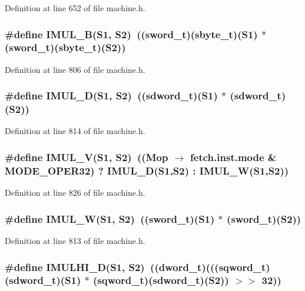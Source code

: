 Definition at line 652 of file machine.h.
\subsubsection[{IMUL\_\-B}]{\setlength{\rightskip}{0pt plus 5cm}\#define IMUL\_\-B(S1, \/  S2)~(({\bf sword\_\-t})({\bf sbyte\_\-t})(S1) $\ast$ ({\bf sword\_\-t})({\bf sbyte\_\-t})(S2))}\label{machine_8h_cafafb68534b37851dfa11e6515ffd0f}




Definition at line 806 of file machine.h.
\subsubsection[{IMUL\_\-D}]{\setlength{\rightskip}{0pt plus 5cm}\#define IMUL\_\-D(S1, \/  S2)~(({\bf sdword\_\-t})(S1) $\ast$ ({\bf sdword\_\-t})(S2))}\label{machine_8h_0c66111ef2b043f4fe01d81da678c6b4}




Definition at line 814 of file machine.h.
\subsubsection[{IMUL\_\-V}]{\setlength{\rightskip}{0pt plus 5cm}\#define IMUL\_\-V(S1, \/  S2)~((Mop $\rightarrow$ fetch.inst.mode \& MODE\_\-OPER32) ? IMUL\_\-D(S1,S2) : IMUL\_\-W(S1,S2))}\label{machine_8h_2ff4235e7ab1b8c32112965e6a3f339c}




Definition at line 826 of file machine.h.
\subsubsection[{IMUL\_\-W}]{\setlength{\rightskip}{0pt plus 5cm}\#define IMUL\_\-W(S1, \/  S2)~(({\bf sword\_\-t})(S1) $\ast$ ({\bf sword\_\-t})(S2))}\label{machine_8h_a920fdd017c530844661ca214ff48dd9}




Definition at line 813 of file machine.h.
\subsubsection[{IMULHI\_\-D}]{\setlength{\rightskip}{0pt plus 5cm}\#define IMULHI\_\-D(S1, \/  S2)~(({\bf dword\_\-t})(((sqword\_\-t)({\bf sdword\_\-t})(S1) $\ast$ (sqword\_\-t)({\bf sdword\_\-t})(S2)) $>$$>$ 32))}\label{machine_8h_43351b8af6ca5043f090d296ef7f6be4}




